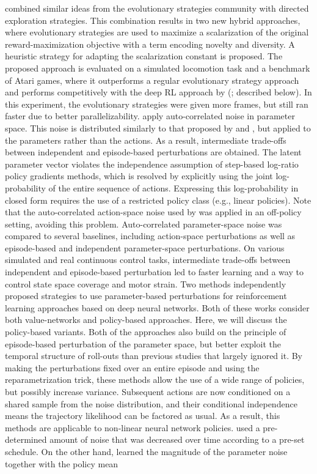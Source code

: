  combined similar ideas from the evolutionary strategies community with directed exploration strategies. This combination results in two new hybrid approaches, where evolutionary strategies are used to maximize a scalarization of the original reward-maximization objective with a term encoding novelty and diversity. A heuristic strategy for adapting the scalarization constant is proposed. The proposed approach is evaluated on a simulated locomotion task and a benchmark of Atari games, where it outperforms a regular evolutionary strategy approach and performs competitively with the deep RL approach by \citeauthor{fortunato2018noisy} (\citeyear{fortunato2018noisy}; described below). In this experiment, the evolutionary strategies were given more frames, but still ran faster due to better parallelizability.
 apply auto-correlated noise in parameter space. This noise is  distributed similarly to that proposed by  and , but applied to the parameters rather than the actions. As a result, intermediate trade-offs between independent and episode-based perturbations are obtained. The latent parameter vector violates the independence assumption of step-based log-ratio policy gradients methods, which is resolved by explicitly using the joint log-probability of the entire sequence of actions. Expressing this log-probability in closed form requires the use of a restricted policy class (e.g., linear policies). Note that the auto-correlated action-space noise used by  was applied in an off-policy setting, avoiding this problem. Auto-correlated parameter-space noise was compared to several baselines, including action-space perturbations as well as episode-based and independent parameter-space perturbations. On various simulated and real continuous control tasks, intermediate trade-offs between independent and episode-based perturbation led to faster learning and a way to control state space coverage and motor strain.
Two methods   independently proposed strategies to use parameter-based perturbations for reinforcement learning approaches based on deep neural networks. Both of these works consider both value-networks and policy-based approaches. Here, we will discuss the policy-based variants.  Both of the approaches  also build on the principle of episode-based perturbation of the parameter space, but better exploit the temporal structure of roll-outs than previous studies  that largely ignored it. 
By making the perturbations fixed over an entire episode and using the reparametrization trick, these methods allow the use of a wide range of policies, but possibly increase variance. Subsequent actions are now conditioned on a shared sample from the noise distribution, and their conditional independence means the trajectory likelihood can be factored as usual. As a result, this methods are applicable to non-linear neural network policies.  used a pre-determined amount of noise that was decreased over time according to a pre-set schedule. On the other hand,  learned the magnitude of the parameter noise together with the policy mean
